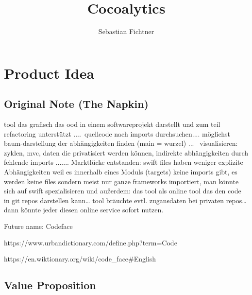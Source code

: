 \documentclass{article}
\title{Cocoalytics}
\author{Sebastian Fichtner}
\begin{document}
\maketitle
\newpage

\tableofcontents
\newpage

\section{Product Idea}

\subsection{Original Note (The Napkin)}

tool das grafisch das ood in einem softwareprojekt darstellt und zum teil refactoring unterstützt .... quellcode nach imports durchsuchen.... möglichst baum-darstellung der abhängigkeiten finden (main = wurzel) ...  visualisieren: zyklen, mvc, daten die privatisiert werden können, indirekte abhängigkeiten durch fehlende imports ....... Marktlücke entstanden: swift files haben weniger explizite Abhängigkeiten weil es innerhalb eines Moduls (targets) keine imports gibt, es werden keine files sondern meist nur ganze frameworks importiert, man könnte sich auf swift spezialisieren und außerdem: das tool als online tool das den code in git repos darstellen kann… tool bräuchte evtl. zugansdaten bei privaten repos… dann könnte jeder diesen online service sofort nutzen.

Future name: Codeface
	
	https://www.urbandictionary.com/define.php?term=Code%
	
	https://en.wiktionary.org/wiki/code_face#English

\subsection{Value Proposition}
\end{document}
